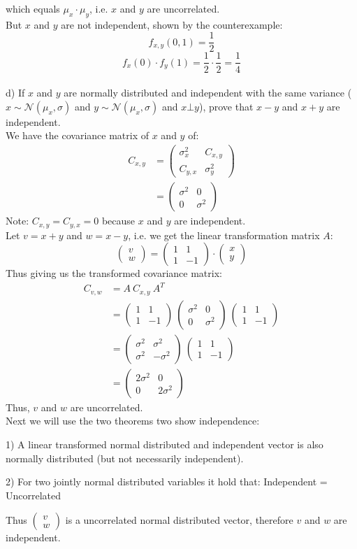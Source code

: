\documentclass[a4paper,footsepline]{scrartcl}
\newcommand{\vect}[1]{\begin{pmatrix} #1\end{pmatrix}}
\begin{document}
	which equals $\mu_x \cdot \mu_y$, i.e. $x$ and $y$ are uncorrelated.\\
	But $x$ and $y$ are not independent, shown by the counterexample:
	\[ f_{x,y}(0,1) = \frac{1}{2} \]
	\[ f_x(0) \cdot f_y(1) = \frac{1}{2} \cdot \frac{1}{2} =\frac{1}{4}  \]
	\vspace{0.4cm}\\
	d) If $x$ and $y$ are normally distributed and independent with the same variance ($x \sim  \mathcal{N}(\mu_x, \sigma)$ and $y \sim  \mathcal{N}(\mu_x, \sigma)$ and $x \bot y$), prove that $x-y$ and $x+y$ are independent.
	\vspace{0.2cm}\\
	We have the covariance matrix of $x$ and $y$ of:
	\begin{align*}
		C_{x,y} &= \vect{\sigma_x^2 & C_{x,y}\\C_{y,x} & \sigma_y^2}\\
		&=\vect{\sigma^2 & 0 \\0 & \sigma^2}
	\end{align*}
	Note: $C_{x,y} = C_{y,x} = 0$ because $x$ and $y$ are independent.\vspace{0.2cm}\\
	Let $v = x + y$ and $w=x-y$, i.e. we get the linear transformation matrix $A$:
	\[ \vect{v\\w} = \vect{ 1 & 1 \\ 1 & -1} \cdot \vect{x\\y} \] 
	Thus giving us the transformed covariance matrix:
	\begin{align*}
		C_{v,w} &= A\ C_{x,y}\ A^T\\
		&= \vect{ 1 & 1 \\ 1 & -1}\ \vect{\sigma^2 & 0 \\0 & \sigma^2}\ \vect{1 & 1\\1 & -1}\\
		&= \vect{\sigma^2 & \sigma^2\\\sigma^2 & -\sigma^2} \ \vect{1 & 1\\1 & -1}\\
		&= \vect{2 \sigma^2 & 0\\0 & 2 \sigma^2}
	\end{align*}
	Thus, $v$ and $w$ are uncorrelated.\\
	Next we will use the two theorems two show independence:\\
	\begin{framed}
		1) A linear transformed normal distributed and independent vector is also normally distributed (but not necessarily independent).
	\end{framed}
	\begin{framed}
		2) For two jointly normal distributed variables it hold that: Independent = Uncorrelated
	\end{framed}
	Thus $\vect{v\\w}$ is a uncorrelated normal distributed vector, therefore $v$ and $w$ are independent.
\end{document}
